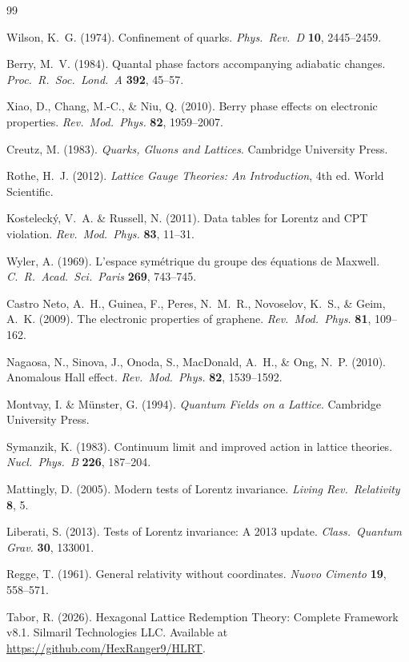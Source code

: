 \documentclass[12pt,a4paper]{article}
\theoremstyle{plain}
\theoremstyle{definition}
\begin{document}
\begin{thebibliography}{99}

 Wilson, K.~G. (1974). Confinement of quarks. \textit{Phys.\ Rev.\ D} \textbf{10}, 2445--2459.

 Berry, M.~V. (1984). Quantal phase factors accompanying adiabatic changes. \textit{Proc.\ R.\ Soc.\ Lond.\ A} \textbf{392}, 45--57.

 Xiao, D., Chang, M.-C., \& Niu, Q. (2010). Berry phase effects on electronic properties. \textit{Rev.\ Mod.\ Phys.} \textbf{82}, 1959--2007.

 Creutz, M. (1983). \textit{Quarks, Gluons and Lattices}. Cambridge University Press.

 Rothe, H.~J. (2012). \textit{Lattice Gauge Theories: An Introduction}, 4th ed. World Scientific.

 Kosteleck\'y, V.~A. \& Russell, N. (2011). Data tables for Lorentz and CPT violation. \textit{Rev.\ Mod.\ Phys.} \textbf{83}, 11--31.

 Wyler, A. (1969). L'espace sym\'etrique du groupe des \'equations de Maxwell. \textit{C.~R.\ Acad.\ Sci.\ Paris} \textbf{269}, 743--745.

 Castro Neto, A.~H., Guinea, F., Peres, N.~M.~R., Novoselov, K.~S., \& Geim, A.~K. (2009). The electronic properties of graphene. \textit{Rev.\ Mod.\ Phys.} \textbf{81}, 109--162.

 Nagaosa, N., Sinova, J., Onoda, S., MacDonald, A.~H., \& Ong, N.~P. (2010). Anomalous Hall effect. \textit{Rev.\ Mod.\ Phys.} \textbf{82}, 1539--1592.

 Montvay, I. \& M\"unster, G. (1994). \textit{Quantum Fields on a Lattice}. Cambridge University Press.

 Symanzik, K. (1983). Continuum limit and improved action in lattice theories. \textit{Nucl.\ Phys.\ B} \textbf{226}, 187--204.

 Mattingly, D. (2005). Modern tests of Lorentz invariance. \textit{Living Rev.\ Relativity} \textbf{8}, 5.

 Liberati, S. (2013). Tests of Lorentz invariance: A 2013 update. \textit{Class.\ Quantum Grav.} \textbf{30}, 133001.

 Regge, T. (1961). General relativity without coordinates. \textit{Nuovo Cimento} \textbf{19}, 558--571.

 Tabor, R. (2026). Hexagonal Lattice Redemption Theory: Complete Framework v8.1. Silmaril Technologies LLC. Available at \url{https://github.com/HexRanger9/HLRT}.

\end{thebibliography}
\end{document}
